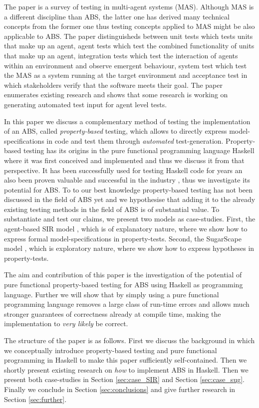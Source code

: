 The paper \cite{nguyen_testing_2011} is a survey of testing in multi-agent systems (MAS). Although MAS is a different discipline than ABS, the latter one has derived many technical concepts from the former one thus testing concepts applied to MAS might be also applicable to ABS. The paper distinguisheds between unit tests which tests units that make up an agent, agent tests which test the combined functionality of units that make up an agent, integration tests which test the interaction of agents within an environment and observe emergent behaviour, system test which test the MAS as a system running at the target environment and acceptance test in which stakeholders verify that the software meets their goal. The paper enumerates existing research and shows that some research is working on generating automated test input for agent level tests.

In this paper we discuss a complementary method of testing the implementation of an ABS, called \textit{property-based} testing, which allows to directly express model-specifications in code and test them through \textit{automated} test-generation. Property-based testing has its origins \cite{claessen_quickcheck:_2000, claessen_testing_2002, runciman_smallcheck_2008} in the pure functional programming language Haskell \cite{hudak_history_2007} where it was first conceived and implemented and thus we discuss it from that perspective. It has been successfully used for testing Haskell code for years an also been proven valuable and successful in the industry \cite{hughes_quickcheck_2007}, thus we investigate its potential for ABS. To to our best knowledge property-based testing has not been discussed in the field of ABS yet and we hypothesise that adding it to the already existing testing methods in the field of ABS is of substantial value. To substantiate and test our claims, we present two models as case-studies. First, the agent-based SIR model \cite{macal_agent-based_2010}, which is of explanatory nature, where we show how to express formal model-specifications in property-tests. Second, the SugarScape model \cite{epstein_growing_1996}, which is exploratory nature, where we show how to express hypotheses in property-tests.

The aim and contribution of this paper is the investigation of the potential of pure functional property-based testing for ABS using Haskell as programming language. Further we will show that by simply using a pure functional programming language removes a large class of run-time errors and allows much stronger guarantees of correctness already at compile time, making the implementation to \textit{very likely} be correct.

The structure of the paper is as follows. First we discuss the background in which we conceptually introduce property-based testing and pure functional programming in Haskell to make this paper sufficiently self-contained. Then we shortly present existing research on \textit{how} to implement ABS in Haskell. Then we present both case-studies in Section \ref{sec:case_SIR} and Section \ref{sec:case_sug}. Finally we conclude in Section \ref{sec:conclusions} and give further research in Section \ref{sec:further}. 